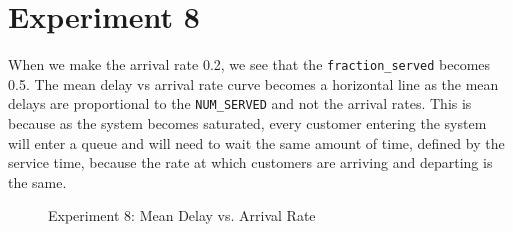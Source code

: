 \section*{Experiment 8}
When we make the arrival rate 0.2, we see that the \texttt{fraction\_served} becomes 0.5. The mean delay vs arrival rate curve becomes a horizontal line as the mean delays are proportional to the \texttt{NUM\_SERVED} and not the arrival rates.
This is because as the system becomes saturated, every customer entering the system will enter a queue and will need to wait the same amount of time, defined by the service time, because the rate at which customers are arriving and departing is the same.
\begin{figure}[h]
\centering
{}
\caption{Experiment 8: Mean Delay vs. Arrival Rate}
\label{fig:exp8}
\end{figure}